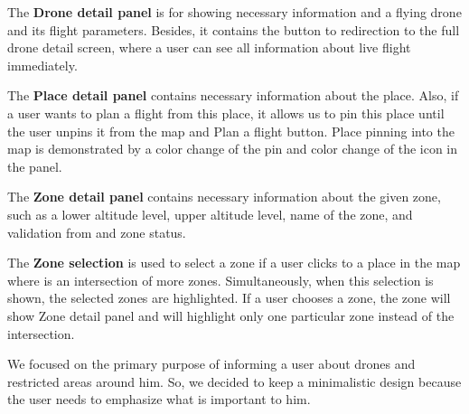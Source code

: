 The \textbf{Drone detail panel} is for showing necessary information and a flying drone and its flight parameters.
Besides, it contains the button to redirection to the full drone detail screen, where a user can see all information about live flight immediately.

The \textbf{Place detail panel} contains necessary information about the place.
Also, if a user wants to plan a flight from this place, it allows us to pin this place until the user unpins it from the map and Plan a flight button.
Place pinning into the map is demonstrated by a color change of the pin and color change of the icon in the panel.

The \textbf{Zone detail panel} contains necessary information about the given zone, such as a lower altitude level, upper altitude level, name of the zone, and validation from and zone status.

The \textbf{Zone selection} is used to select a zone if a user clicks to a place in the map where is an intersection of more zones.
Simultaneously, when this selection is shown, the selected zones are highlighted.
If a user chooses a zone, the zone will show Zone detail panel and will highlight only one particular zone instead of the intersection.

We focused on the primary purpose of informing a user about drones and restricted areas around him.
So, we decided to keep a minimalistic design because the user needs to emphasize what is important to him.


